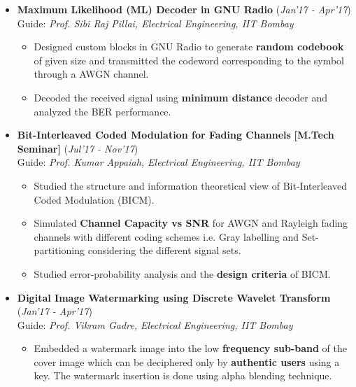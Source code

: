 \documentclass[10pt]{article}
\begin{document}
\begin{itemize}[leftmargin=0.4cm]
\item \textbf{Maximum Likelihood (ML) Decoder in  GNU Radio}
\hfill{(\textit{Jan'17 - Apr'17})}\\
Guide: \textit{Prof. Sibi Raj Pillai, Electrical Engineering, IIT Bombay}\\\vspace{-0.68cm}	
\begin{itemize}
		\item Designed custom blocks in GNU Radio to generate \textbf{random codebook} of given size and transmitted the codeword corresponding to the symbol through a AWGN channel.\vspace{-0.1cm}
		\item Decoded the received signal using \textbf{minimum distance} decoder and analyzed the BER performance.
    \end{itemize}	
    \vspace{-0.2cm}


\item \textbf{Bit-Interleaved Coded Modulation for Fading Channels
} \textbf{[M.Tech Seminar]}
\hfill{(\textit{Jul'17 - Nov'17})}\\
Guide: \textit{Prof. Kumar Appaiah, Electrical Engineering, IIT Bombay}\\\vspace{-0.68cm}
	\begin{itemize}
	\item Studied the structure and information theoretical view of Bit-Interleaved Coded Modulation (BICM).\vspace{-0.1cm}
	\item Simulated \textbf{Channel Capacity vs SNR} for AWGN and Rayleigh fading channels with different coding schemes i.e. Gray labelling and Set-partitioning considering the different signal sets.\vspace{-0.1cm}
	\item Studied error-probability analysis and the \textbf{design criteria} of BICM.

	\end{itemize}
	\vspace{-0.2cm}

\item \textbf{Digital Image Watermarking using Discrete Wavelet Transform}
\hfill{(\textit{Jan'17 - Apr'17})}\\
Guide: \textit{Prof. Vikram Gadre, Electrical Engineering, IIT Bombay}\\\vspace{-0.68cm}
	\begin{itemize}
	\item Embedded a watermark image into the low \textbf{frequency sub-band} of the cover image which can be deciphered only by \textbf{authentic users} using a key. The watermark insertion is done using alpha blending technique.
	\end{itemize}
	\vspace{-0.1cm}

\end{itemize}
\end{document}
